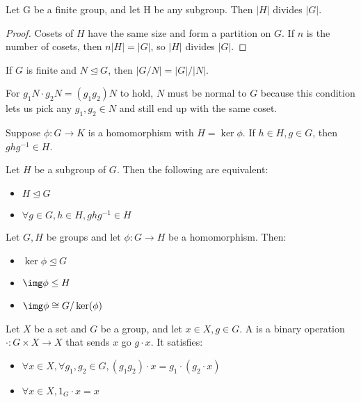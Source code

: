 \documentclass{article}
\begin{document}
\begin{nthm}
  Let G be a finite group, and let H be any subgroup. Then $|H|$ divides $|G|$. 
\end{nthm}
\begin{proof}
  Cosets of $H$ have the same size and form a partition on $G$. If $n$ is the number
  of cosets, then $n|H| = |G|$, so $|H|$ divides $|G|$. 
\end{proof}
\begin{remark}
  If $G$ is finite and $N \trianglelefteq G$, then $|G/N| = |G|/|N|$. 
\end{remark}
\begin{remark}
  For $g_1N \cdot g_2N = (g_1g_2)N$ to hold, $N$ must be normal to $G$ because
  this condition lets us pick any $g_1, g_2 \in N$ and still end up with the
  same coset. 
\end{remark}

\begin{prop}
  Suppose $\phi : G \rightarrow K$ is a homomorphism with $H = \ker \phi$. If
  $h \in H, g \in G$, then $ghg^{-1} \in H$. 
\end{prop}

\begin{nthm}
  Let $H$ be a subgroup of $G$. Then the following are equivalent:
  \begin{itemize}
  \item $H \trianglelefteq G$
  \item $\forall g \in G, h \in H, ghg^{-1} \in H$
  \end{itemize}
\end{nthm}

\begin{nthm}
  Let $G, H$ be groups and let $\phi : G \rightarrow H$ be a homomorphism. Then:
  \begin{itemize}
  \item $\ker \phi \trianglelefteq G$
  \item $\img \phi \leq H$
  \item $\img \phi \cong G / \ker(\phi)$
  \end{itemize}
\end{nthm}

\begin{defn}
  Let $X$ be a set and $G$ be a group, and let $x \in X, g \in G$. A 
  is a binary operation $\cdot : G \times X \rightarrow X$ that sends $x$ go $g \cdot x$.
  It satisfies:
  \begin{itemize}
  \item $\forall x \in X, \forall g_1, g_2 \in G, (g_1g_2) \cdot x = g_1 \cdot (g_2 \cdot x)$
  \item $\forall x \in X, 1_G \cdot x = x$
  \end{itemize}
\end{defn}
\end{document}
